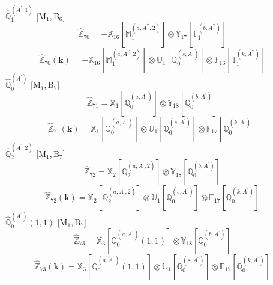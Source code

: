 \documentclass[fleqn,10pt,landscape]{article}
\begin{document}
\begin{itemize}
\vspace{4mm}
\noindent {} $\,\,\,\hat{\mathbb{Q}}_{1}^{(A^{\prime},1)}$ [M$_{1}$,\,B$_{6}$]
\begin{dmath*}
\hat{\mathbb{Z}}_{70}=- \mathbb{X}_{16}[\mathbb{M}_{1}^{(a,A^{\prime\prime},2)}] \otimes\mathbb{Y}_{17}[\mathbb{T}_{1}^{(b,A^{\prime\prime})}]
\end{dmath*}
\begin{dmath*}
\hat{\mathbb{Z}}_{70}(\bm{k})=- \mathbb{X}_{16}[\mathbb{M}_{1}^{(a,A^{\prime\prime},2)}] \otimes\mathbb{U}_{1}[\mathbb{Q}_{0}^{(s,A^{\prime})}] \otimes\mathbb{F}_{16}[\mathbb{T}_{1}^{(k,A^{\prime\prime})}]
\end{dmath*}
\vspace{4mm}
\noindent {} $\,\,\,\hat{\mathbb{Q}}_{0}^{(A^{\prime})}$ [M$_{1}$,\,B$_{7}$]
\begin{dmath*}
\hat{\mathbb{Z}}_{71}=\mathbb{X}_{1}[\mathbb{Q}_{0}^{(a,A^{\prime})}] \otimes\mathbb{Y}_{18}[\mathbb{Q}_{0}^{(b,A^{\prime})}]
\end{dmath*}
\begin{dmath*}
\hat{\mathbb{Z}}_{71}(\bm{k})=\mathbb{X}_{1}[\mathbb{Q}_{0}^{(a,A^{\prime})}] \otimes\mathbb{U}_{1}[\mathbb{Q}_{0}^{(s,A^{\prime})}] \otimes\mathbb{F}_{17}[\mathbb{Q}_{0}^{(k,A^{\prime})}]
\end{dmath*}
\vspace{4mm}
\noindent {} $\,\,\,\hat{\mathbb{Q}}_{2}^{(A^{\prime},2)}$ [M$_{1}$,\,B$_{7}$]
\begin{dmath*}
\hat{\mathbb{Z}}_{72}=\mathbb{X}_{2}[\mathbb{Q}_{2}^{(a,A^{\prime},2)}] \otimes\mathbb{Y}_{18}[\mathbb{Q}_{0}^{(b,A^{\prime})}]
\end{dmath*}
\begin{dmath*}
\hat{\mathbb{Z}}_{72}(\bm{k})=\mathbb{X}_{2}[\mathbb{Q}_{2}^{(a,A^{\prime},2)}] \otimes\mathbb{U}_{1}[\mathbb{Q}_{0}^{(s,A^{\prime})}] \otimes\mathbb{F}_{17}[\mathbb{Q}_{0}^{(k,A^{\prime})}]
\end{dmath*}
\vspace{4mm}
\noindent {} $\,\,\,\hat{\mathbb{Q}}_{0}^{(A^{\prime})}(1,1)$ [M$_{1}$,\,B$_{7}$]
\begin{dmath*}
\hat{\mathbb{Z}}_{73}=\mathbb{X}_{3}[\mathbb{Q}_{0}^{(a,A^{\prime})}(1,1)] \otimes\mathbb{Y}_{18}[\mathbb{Q}_{0}^{(b,A^{\prime})}]
\end{dmath*}
\begin{dmath*}
\hat{\mathbb{Z}}_{73}(\bm{k})=\mathbb{X}_{3}[\mathbb{Q}_{0}^{(a,A^{\prime})}(1,1)] \otimes\mathbb{U}_{1}[\mathbb{Q}_{0}^{(s,A^{\prime})}] \otimes\mathbb{F}_{17}[\mathbb{Q}_{0}^{(k,A^{\prime})}]

\end{dmath*}
\end{itemize}
\end{document}
